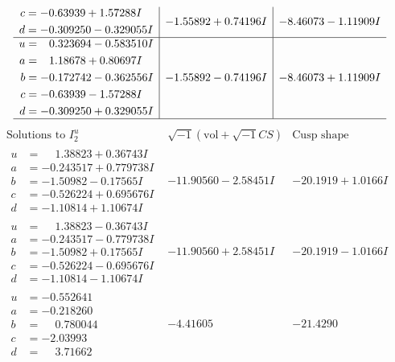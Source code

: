 \documentclass[1p]{elsarticle_modified}
\theoremstyle{definition}
\newcommand{\I}{\sqrt{-1}}
\begin{document}
$$\begin{array}{c|c|c}
\begin{aligned}
c &= -0.63939 + 1.57288 I \\
d &= -0.309250 - 0.329055 I\end{aligned}
 & -1.55892 + 0.74196 I & -8.46073 - 1.11909 I \\ \hline\begin{aligned}
u &= \phantom{-}0.323694 - 0.583510 I \\
a &= \phantom{-}1.18678 + 0.80697 I \\
b &= -0.172742 - 0.362556 I \\
c &= -0.63939 - 1.57288 I \\
d &= -0.309250 + 0.329055 I\end{aligned}
 & -1.55892 - 0.74196 I & -8.46073 + 1.11909 I\\
 \hline 
 \end{array}$$\newpage$$\begin{array}{c|c|c}  
\text{Solutions to }I^u_{2}& \I (\text{vol} + \sqrt{-1}CS) & \text{Cusp shape}\\
 \hline 
\begin{aligned}
u &= \phantom{-}1.38823 + 0.36743 I \\
a &= -0.243517 + 0.779738 I \\
b &= -1.50982 - 0.17565 I \\
c &= -0.526224 + 0.695676 I \\
d &= -1.10814 + 1.10674 I\end{aligned}
 & -11.90560 - 2.58451 I & -20.1919 + 1.0166 I \\ \hline\begin{aligned}
u &= \phantom{-}1.38823 - 0.36743 I \\
a &= -0.243517 - 0.779738 I \\
b &= -1.50982 + 0.17565 I \\
c &= -0.526224 - 0.695676 I \\
d &= -1.10814 - 1.10674 I\end{aligned}
 & -11.90560 + 2.58451 I & -20.1919 - 1.0166 I \\ \hline\begin{aligned}
u &= -0.552641\phantom{ +0.000000I} \\
a &= -0.218260\phantom{ +0.000000I} \\
b &= \phantom{-}0.780044\phantom{ +0.000000I} \\
c &= -2.03993\phantom{ +0.000000I} \\
d &= \phantom{-}3.71662\phantom{ +0.000000I}\end{aligned}
 & -4.41605\phantom{ +0.000000I} & -21.4290\phantom{ +0.000000I} \\ \hline\begin{aligned}

\end{aligned}
\end{array}$$
\end{document}
